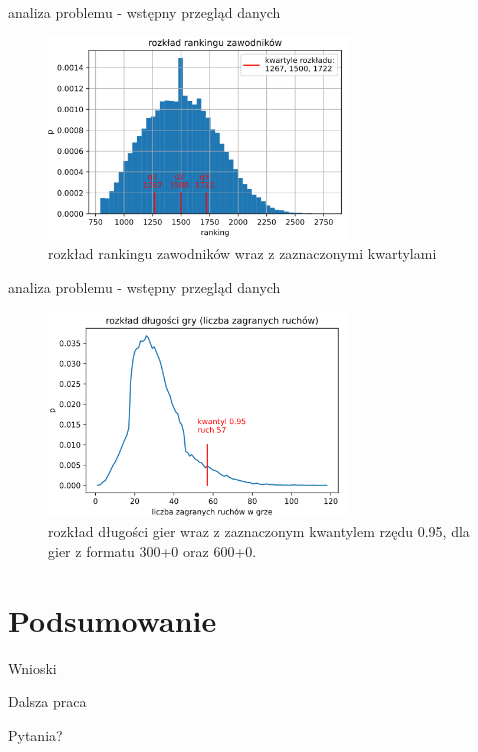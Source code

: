 \documentclass{beamer}
\begin{document}
\begin{frame}{analiza problemu - wstępny przegląd danych}

	\begin{figure}[H]
		\centering
		\includegraphics[width=8cm]{../Formatka/ranking.png}
		\caption{rozkład rankingu zawodników wraz z zaznaczonymi kwartylami}
		\label{rys:rozklad_elo}
	\end{figure}
\end{frame}

\begin{frame}{analiza problemu - wstępny przegląd danych}
	\begin{figure}[H]
		\centering
		\includegraphics[width=8cm]{../Formatka/dlugosc_gry.png}
		\caption{rozkład długości gier wraz z zaznaczonym kwantylem rzędu 0.95,  dla gier z formatu 300+0 oraz 600+0.}
		\label{rys:dlugosc_gier}
	\end{figure}
\end{frame}




\section{Podsumowanie}

\begin{frame}{Wnioski}
\end{frame}

\begin{frame}{Dalsza praca}
\end{frame}

\begin{frame}{Pytania?}
\end{frame}
\end{document}
